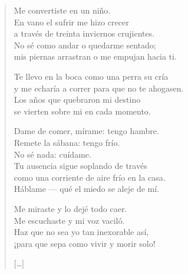 \documentclass[11pt]{book}
\newcommand*{\centeredornament}{\centerline{\pgfornament[width=6cm]{88}}}
\begin{document}
\begin{verse}
  Me convertiste en un niño. \\
  En vano el sufrir me hizo crecer \\
  a través de treinta inviernos crujientes. \\
  No sé como andar o quedarme sentado; \\
  mis piernas arrastran o me empujan hacia ti.

  Te llevo en la boca como una perra su cría \\
  y me echaría a correr para que no te ahogasen.\hspace{-1mm} \\
  Los años que quebraron mi destino \\
  se vierten sobre mi en cada momento.

  Dame de comer, mírame: tengo hambre. \\
  Remete la sábana: tengo frío. \\
  No sé nada: cuídame. \\
  Tu ausencia sigue soplando de través \\
  como una corriente de aire frío en la casa. \\
  Háblame --- qué el miedo se aleje de mí.

  Me miraste y lo dejé todo caer. \\
  Me escuchaste y mi voz vaciló. \\
  Haz que no sea yo tan inexorable así, \\
  ¡para que sepa como vivir y morir solo!

  \hfill [\ldots]
\end{verse}

\newpage

\vspace*{-15mm}
\centeredornament


\end{document}
